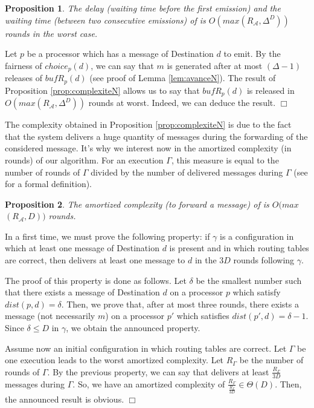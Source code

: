 \documentclass[11pt]{article}
\newtheorem{proposition}{Proposition}
\newenvironment{sketchproof}{{\noindent\bf Sketch of proof. } }{{\hfill $\Box$}}
\begin{document}
\begin{proposition} \label{prop:delaiN}
The delay (waiting time before the first emission) and the waiting time (between two consecutive emissions) of \AN is $O(max(R_{\mathcal{A}},\Delta^{D}))$ rounds in the worst case.
\end{proposition}

\begin{sketchproof}
Let $p$ be a processor which has a message of Destination $d$ to emit. By the fairness of $choice_{p}(d)$, we can say that $m$ is generated after at most $(\Delta-1)$ releases of $bufR_{p}(d)$ (see proof of Lemma \ref{lem:avanceN}). The result of Proposition \ref{prop:complexiteN} allows us to say that $bufR_{p}(d)$ is released in $O(max(R_{\mathcal{A}},\Delta^{D}))$ rounds at worst. Indeed, we can deduce the result.
\end{sketchproof}

The complexity obtained in Proposition \ref{prop:complexiteN} is due to the fact that the system delivers a huge quantity of messages during the forwarding of the considered message. It's why we interest now in the amortized complexity (in rounds) of our algorithm. For an execution $\Gamma$, this measure is equal to the number of rounds of $\Gamma$ divided by the number of delivered messages during $\Gamma$ (see \cite{CLRS02} for a formal definition).

\begin{proposition} \label{prop:amortieN}
The amortized complexity (to forward a message) of \AN is $O(max$ $(R_{\mathcal{A}},D))$ rounds.
\end{proposition}

\begin{sketchproof}
In a first time, we must prove the following property: if $\gamma$ is a configuration in which at least one message of Destination $d$ is present and in which routing tables are correct, then \AN delivers at least one message to $d$ in the $3D$ rounds following $\gamma$. 

The proof of this property is done as follows. Let $\delta$ be the smallest number such that there exists a message of Destination $d$ on a processor $p$ which satisfy $dist(p,d)=\delta$. Then, we prove that, after at most three rounds, there exists a message (not necessarily $m$) on a processor $p'$ which satisfies $dist(p',d)=\delta-1$. Since $\delta\leq D$ in $\gamma$, we obtain the announced property.
 
Assume now an initial configuration in which routing tables are correct. Let $\Gamma$ be one execution leads to the worst amortized complexity. Let $R_{\Gamma}$ be the number of rounds of $\Gamma$. By the previous property, we can say that \AN delivers at least $\frac{R_{\Gamma}}{3D}$ messages during $\Gamma$. So, we have an amortized complexity of $\frac{R_{\Gamma}}{\frac{R_{\Gamma}}{3D}}\in\Theta(D)$. Then, the announced result is obvious.
\end{sketchproof}
\end{document}
